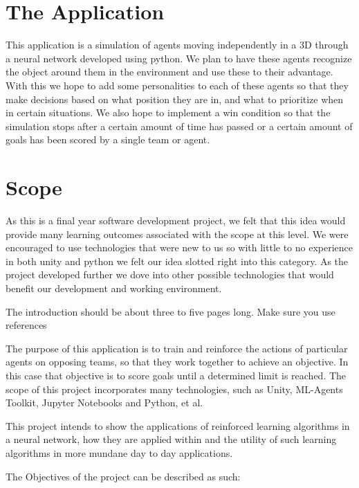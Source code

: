 \section{The Application}
This application is a simulation of agents moving independently in a 3D through a neural network developed using python. We plan to have these agents recognize the object around them in the environment and use these to their advantage. With this we hope to add some personalities to each of these agents so that they make decisions based on what position they are in, and what to prioritize when in certain situations. We also hope to implement a win condition so that the simulation stops after a certain amount of time has passed or a certain amount of goals has been scored by a single team or agent.

\section{Scope}
As this is a final year software development project, we felt that this idea would provide many learning outcomes associated with the scope at this level. We were encouraged to use technologies that were new to us so with little to no experience in both unity and python we felt our idea slotted right into this category. As the project developed further we dove into other possible technologies that would benefit our development and working environment.




The introduction should be about three to five pages long.
Make sure you use references~\cite{einstein}

The purpose of this application is to train and reinforce the actions of particular agents on opposing teams, so that they work together to achieve an objective. In this case that objective is to score goals until a determined limit is reached. The scope of this project incorporates many technologies, such as Unity, ML-Agents Toolkit, Jupyter Notebooks and Python, et al. 

This project intends to show the applications of reinforced learning algorithms in a neural network, how they are applied within and the utility of such learning algorithms in more mundane day to day applications.



The Objectives of the project can be described as such:

